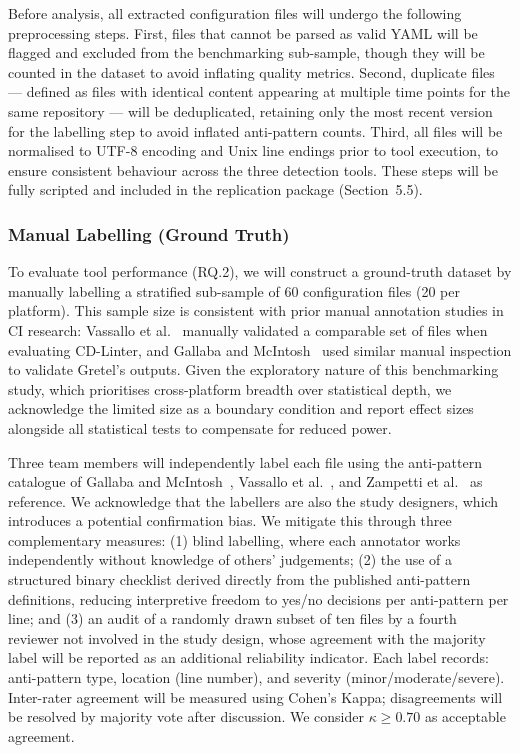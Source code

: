 \documentclass[12pt, a4paper]{article}
\begin{document}
Before analysis, all extracted configuration files will undergo the following
preprocessing steps. First, files that cannot be parsed as valid YAML will be
flagged and excluded from the benchmarking sub-sample, though they will be counted
in the dataset to avoid inflating quality metrics. Second, duplicate files ---
defined as files with identical content appearing at multiple time points for the
same repository --- will be deduplicated, retaining only the most recent version
for the labelling step to avoid inflated anti-pattern counts. Third, all files will
be normalised to UTF-8 encoding and Unix line endings prior to tool execution, to
ensure consistent behaviour across the three detection tools. These steps will be
fully scripted and included in the replication package (Section~5.5).

\subsubsection{Manual Labelling (Ground Truth)}

To evaluate tool performance (RQ.2), we will construct a ground-truth dataset by
manually labelling a stratified sub-sample of 60 configuration files (20 per platform).
This sample size is consistent with prior manual annotation studies in CI research:
Vassallo et al.~\cite{vassallo2020b} manually validated a comparable set of files
when evaluating CD-Linter, and Gallaba and McIntosh~\cite{gallaba2020} used similar
manual inspection to validate Gretel's outputs. Given the exploratory nature of this
benchmarking study, which prioritises cross-platform breadth over statistical depth,
we acknowledge the limited size as a boundary condition and report effect sizes
alongside all statistical tests to compensate for reduced power.

Three team members will independently label each file using the anti-pattern catalogue
of Gallaba and McIntosh~\cite{gallaba2020}, Vassallo et al.~\cite{vassallo2020b},
and Zampetti et al.~\cite{zampetti2020} as reference. We acknowledge that the
labellers are also the study designers, which introduces a potential confirmation bias.
We mitigate this through three complementary measures: (1) blind labelling, where
each annotator works independently without knowledge of others' judgements; (2) the
use of a structured binary checklist derived directly from the published anti-pattern
definitions, reducing interpretive freedom to yes/no decisions per anti-pattern per
line; and (3) an audit of a randomly drawn subset of ten files by a fourth reviewer
not involved in the study design, whose agreement with the majority label will be
reported as an additional reliability indicator.
Each label records: anti-pattern type, location (line number), and severity
(minor/moderate/severe). Inter-rater agreement will be measured using Cohen's Kappa;
disagreements will be resolved by majority vote after discussion. We consider
$\kappa \geq 0.70$ as acceptable agreement.
\end{document}
